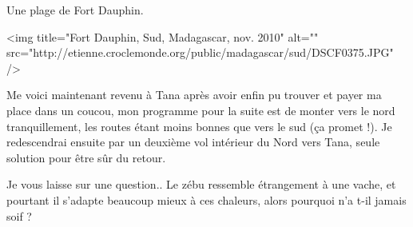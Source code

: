 Une plage de Fort Dauphin.

<img title="Fort Dauphin, Sud, Madagascar, nov. 2010" alt="" src="http://etienne.croclemonde.org/public/madagascar/sud/DSCF0375.JPG" />

Me voici maintenant revenu à Tana après avoir enfin pu trouver et payer ma place dans un coucou, mon programme pour la suite est de monter vers le nord tranquillement, les routes étant moins bonnes que vers le sud (ça promet !). Je redescendrai ensuite par un deuxième vol intérieur du Nord vers Tana, seule solution pour être sûr du retour.

Je vous laisse sur une question.. Le zébu ressemble étrangement à une vache, et pourtant il s'adapte beaucoup mieux à ces chaleurs, alors pourquoi n'a t-il jamais soif ?
